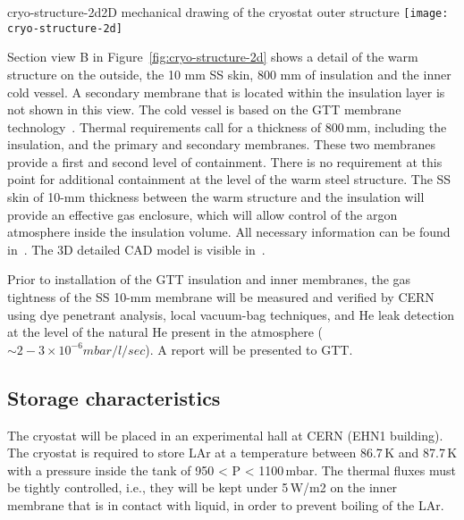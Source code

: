 \begin{cdrfigure}{cryo-structure-2d}{2D mechanical drawing of the cryostat outer structure}
  \texttt{[image: cryo-structure-2d]}
\end{cdrfigure}

Section view B in Figure~\ref{fig:cryo-structure-2d} shows a detail of the warm structure on the outside, the 10 mm SS skin, 800 mm of insulation and the inner cold vessel. 
A secondary membrane that is located within the insulation layer is not shown in this view.  The cold vessel is based on the GTT membrane technology~\cite{gtt}.   Thermal requirements 
call for %
a thickness of 800\,mm, including the insulation, and the primary and secondary membranes. These two membranes provide a first and second level of containment. There is no requirement at this point for additional containment at the level of the warm steel structure. The SS skin of 10-mm thickness between the warm structure and the insulation will provide an effective gas enclosure, which will allow control of the argon atmosphere inside the insulation volume.
All necessary information can be found in~\cite{edms1}. 
The 3D detailed CAD model is visible in~\cite{edms2}. 

Prior to installation of the GTT insulation and %
inner membranes, the gas tightness of the SS 10-mm membrane will be measured and verified by CERN using dye penetrant analysis, local vacuum-bag techniques, and He leak %
detection at the level of the natural He present in the atmosphere ($\sim2-3 \times 10^{-6} mbar/l/sec$). A report will be presented to GTT.

\subsection{Storage characteristics}


The cryostat will be placed in an experimental hall at CERN (EHN1 building). The 
cryostat is required to store LAr at a temperature between 86.7\,K and 87.7\,K with a pressure inside the 
tank of 950 < P < 1100\,mbar. %
The thermal fluxes must be tightly controlled, i.e., %
they will be kept under 5\,W/m2 on %
the inner membrane that is in contact with liquid, in order to prevent boiling of the LAr.

